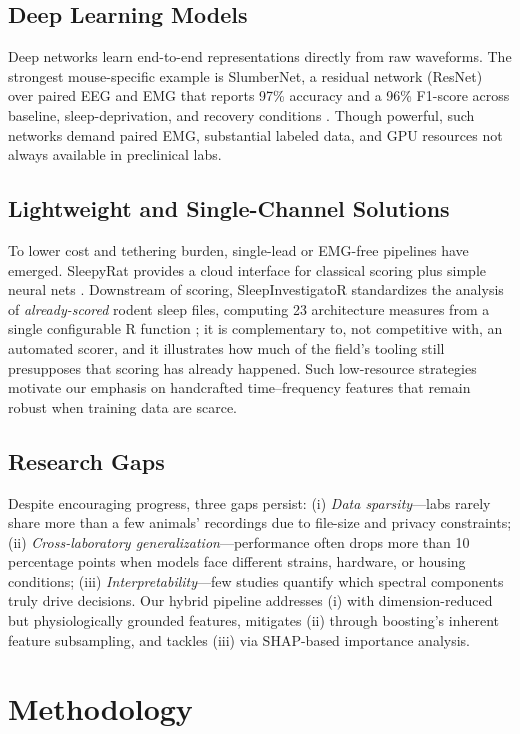 \documentclass[letterpaper]{article} %
\begin{document}
\subsection{Deep Learning Models}
Deep networks learn end-to-end representations directly from raw waveforms. The strongest mouse-specific example is SlumberNet, a residual network (ResNet) over paired EEG and EMG that reports 97\% accuracy and a 96\% F1-score across baseline, sleep-deprivation, and recovery conditions \citep{jha2024_slumbernet}. Though powerful, such networks demand paired EMG, substantial labeled data, and GPU resources not always available in preclinical labs.

\subsection{Lightweight and Single-Channel Solutions}
To lower cost and tethering burden, single-lead or EMG-free pipelines have emerged. SleepyRat provides a cloud interface for classical scoring plus simple neural nets \citep{sleepyrat2025_platform}. Downstream of scoring, SleepInvestigatoR standardizes the analysis of \emph{already-scored} rodent sleep files, computing 23 architecture measures from a single configurable R function \citep{gamble2025_sleepinvestigator}; it is complementary to, not competitive with, an automated scorer, and it illustrates how much of the field's tooling still presupposes that scoring has already happened. Such low-resource strategies motivate our emphasis on handcrafted time--frequency features that remain robust when training data are scarce.

\subsection{Research Gaps}
Despite encouraging progress, three gaps persist:
(i) \emph{Data sparsity}---labs rarely share more than a few animals' recordings due to file-size and privacy constraints;
(ii) \emph{Cross-laboratory generalization}---performance often drops more than 10 percentage points when models face different strains, hardware, or housing conditions;
(iii) \emph{Interpretability}---few studies quantify which spectral components truly drive decisions.
Our hybrid pipeline addresses (i) with dimension-reduced but physiologically grounded features, mitigates (ii) through boosting's inherent feature subsampling, and tackles (iii) via SHAP-based importance analysis.

\section{Methodology}
\end{document}
